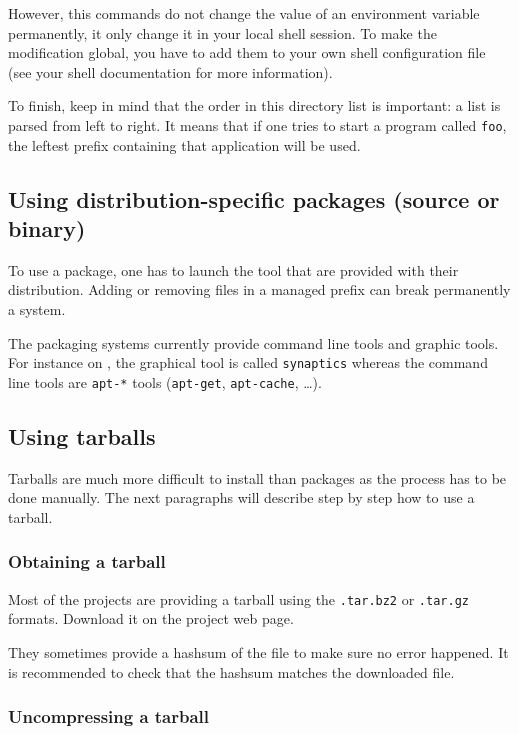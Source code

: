 However, this commands do not change the value of an environment
variable permanently, it only change it in your local shell
session. To make the modification global, you have to add them to your
own shell configuration file (see your shell documentation for more
information).

To finish, keep in mind that the order in this directory list is
important: a list is parsed from left to right. It means that if one
tries to start a program called \texttt{foo}, the leftest prefix
containing that application will be used.


\subsection{Using distribution-specific packages (source or binary)}


To use a package, one has to launch the tool that are provided with
their \linux distribution. Adding or removing files in a managed
prefix can break permanently a system.


The packaging systems currently provide command line tools and graphic
tools. For instance on \ubuntu, the graphical tool is called
\texttt{synaptics} whereas the command line tools are \texttt{apt-*}
tools (\texttt{apt-get}, \texttt{apt-cache}, \ldots).


\subsection{Using tarballs}


Tarballs are much more difficult to install than packages as the
process has to be done manually.  The next paragraphs will describe
step by step how to use a tarball.


\subsubsection{Obtaining a tarball}

Most of the projects are providing a tarball using the
\texttt{.tar.bz2} or \texttt{.tar.gz} formats. Download it on the
project web page.

They sometimes provide a hashsum of the file to make sure no error
happened. It is recommended to check that the hashsum matches the
downloaded file.


\subsubsection{Uncompressing a tarball}


